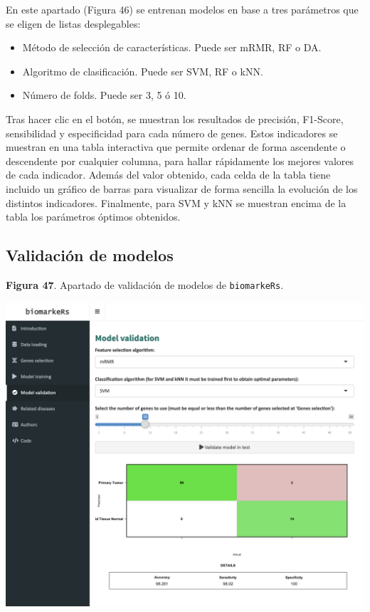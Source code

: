 En este apartado (Figura 46) se entrenan modelos en base a tres parámetros que se eligen de listas desplegables:
\begin{itemize}
	\item Método de selección de características. Puede ser mRMR, RF o DA.
	\item Algoritmo de clasificación. Puede ser SVM, RF o kNN.
	\item Número de folds. Puede ser 3, 5 ó 10.
\end{itemize}

Tras hacer clic en el botón, se muestran los resultados de precisión, F1-Score, sensibilidad y especificidad para cada número de genes. Estos indicadores se muestran en una tabla interactiva que permite ordenar de forma ascendente o descendente por cualquier columna, para hallar rápidamente los mejores valores de cada indicador. Además del valor obtenido, cada celda de la tabla tiene incluido un gráfico de barras para visualizar de forma sencilla la evolución de los distintos indicadores. Finalmente, para SVM y kNN se muestran encima de la tabla los parámetros óptimos obtenidos.

\subsection{Validación de modelos}

\begin{center}
	\textbf{Figura 47}. Apartado de validación de modelos de \texttt{biomarkeRs}.
\end{center}

\begin{center}
	\includegraphics[width=.90\textwidth]{figuras/47_model_validation.png} \\
\end{center}

